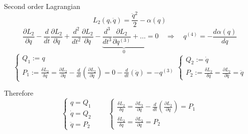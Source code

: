 \begin{frame}{Second order Lagrangian}
  \begin{equation*}
    L_2(q, \ddot{q}) = \frac{\ddot{q}^2}{2} - \alpha(q)
  \end{equation*}
  \vspace{0.2em}
  \begin{equation*} \label{eq: second-order_motion_eq_lagr}
    \frac{\partial L_2}{\partial q} -
    \frac{d}{dt}\frac{\partial L_2}{\partial \dot{q}} +
    \frac{d^2}{dt^2}\frac{\partial L_2}{\partial \ddot{q}} -
    \underbrace{
      \frac{d^3}{dt^3}\frac{\partial L_2}{\partial q^{(3)}} + \ldots
    }_0 = 0
    \quad \Rightarrow \quad
    q^{(4)} = - \frac{d\alpha(q)}{dq}
  \end{equation*}
  \begin{equation*}
    \begin{cases}
      Q_1 := q \\
      P_1 := \frac{\delta L_2}{\delta \dot{q}}
           = \frac{\partial L_2}{\partial \dot{q}} -
             \frac{d}{dt} \left( \frac{\partial L_2}{\partial \ddot{q}} \right)
           = 0 - \frac{d}{dt} \left( \ddot{q} \right) = -q^{(3)}
    \end{cases}
    \begin{cases}
      Q_2 := \dot{q} \\
      P_2 := \frac{\delta L_2}{\delta \ddot{q}}
           = \frac{\partial L_2}{\partial \ddot{q}} = \ddot{q}
    \end{cases}
  \end{equation*}

  Therefore
  \begin{equation*}
    \begin{cases}
      q        = Q_1 \\
      \dot{q}  = Q_2 \\
      \ddot{q} = P_2
    \end{cases}
    \qquad
    \begin{cases}
      \frac{\delta L_2}{\delta \dot{q}} =
        \frac{\partial L_2}{\partial \dot{q}} -
        \frac{d}{dt} \left( \frac{\partial L_2}{\partial \ddot{q}} \right) =
        P_1 \\
      \frac{\delta L_2}{\delta \ddot{q}} =
        \frac{\partial L_2}{\partial \ddot{q}} =
        P_2
    \end{cases}
  \end{equation*}
\end{frame}


